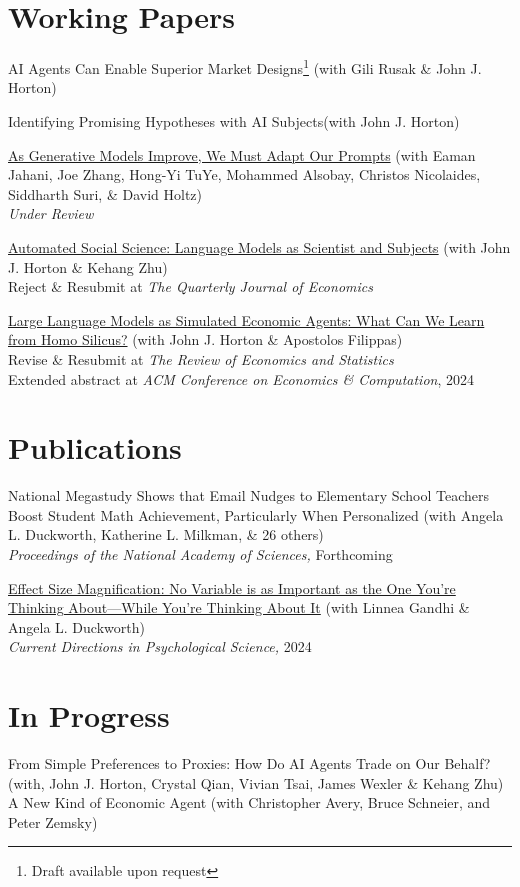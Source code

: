 \documentclass[margin,line,pifont,palatino,courier, 9pt]{res}
\begin{document}
\begin{resume}
\section{\sc Working Papers}

AI Agents Can Enable Superior Market Designs\footnote{Draft available upon request} (with Gili Rusak \& John J. Horton)

Identifying Promising Hypotheses with AI Subjects\footnotemark[\value{footnote}] (with John J. Horton)

\href{https://arxiv.org/abs/2407.14333}{As Generative Models Improve, We Must Adapt Our Prompts} (with Eaman Jahani, Joe Zhang, Hong-Yi TuYe, Mohammed Alsobay, Christos Nicolaides, Siddharth
Suri, \& David Holtz)\\
\textit{Under Review}

\href{https://www.nber.org/papers/w32381}{Automated Social Science: Language Models as Scientist and Subjects} (with John J. Horton \& Kehang Zhu)\\
Reject \& Resubmit at \textit{The Quarterly Journal of Economics}

\href{https://www.nber.org/papers/w31122}{Large Language Models as Simulated Economic Agents: What Can We Learn from Homo Silicus?} (with John J. Horton \& Apostolos Filippas)\\
Revise \& Resubmit at \textit{The Review of Economics and Statistics}\\
Extended abstract at \textit{ACM Conference on Economics \& Computation}, 2024


\section{\sc Publications}
National Megastudy Shows that Email Nudges to Elementary School Teachers Boost Student Math Achievement, Particularly When Personalized 
(with Angela L. Duckworth, Katherine L. Milkman, \& 26 others)\\
\textit{Proceedings of the National Academy of Sciences,} Forthcoming

\href{https://journals.sagepub.com/doi/full/10.1177/09637214241268222}{Effect Size Magnification: No Variable is as Important as the One You're Thinking About---While You're Thinking About It} (with Linnea Gandhi \& Angela L. Duckworth)\\
\textit{Current Directions in Psychological Science,} 2024

\section{\sc In Progress}
From Simple Preferences to Proxies: How Do AI Agents Trade on Our Behalf?
(with, John J. Horton, Crystal Qian, Vivian Tsai, James Wexler \& Kehang Zhu)\\
A New Kind of Economic Agent
(with Christopher Avery, Bruce Schneier, and Peter Zemsky)


\end{resume}
\end{document}
